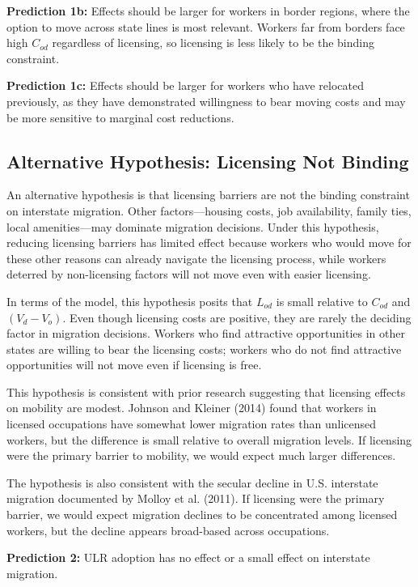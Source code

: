 \documentclass[12pt]{article}
\begin{document}
\textbf{Prediction 1b:} Effects should be larger for workers in border regions, where the option to move across state lines is most relevant. Workers far from borders face high $C_{od}$ regardless of licensing, so licensing is less likely to be the binding constraint.

\textbf{Prediction 1c:} Effects should be larger for workers who have relocated previously, as they have demonstrated willingness to bear moving costs and may be more sensitive to marginal cost reductions.

\subsection{Alternative Hypothesis: Licensing Not Binding}

An alternative hypothesis is that licensing barriers are not the binding constraint on interstate migration. Other factors---housing costs, job availability, family ties, local amenities---may dominate migration decisions. Under this hypothesis, reducing licensing barriers has limited effect because workers who would move for these other reasons can already navigate the licensing process, while workers deterred by non-licensing factors will not move even with easier licensing.

In terms of the model, this hypothesis posits that $L_{od}$ is small relative to $C_{od}$ and $(V_d - V_o)$. Even though licensing costs are positive, they are rarely the deciding factor in migration decisions. Workers who find attractive opportunities in other states are willing to bear the licensing costs; workers who do not find attractive opportunities will not move even if licensing is free.

This hypothesis is consistent with prior research suggesting that licensing effects on mobility are modest. Johnson and Kleiner (2014) found that workers in licensed occupations have somewhat lower migration rates than unlicensed workers, but the difference is small relative to overall migration levels. If licensing were the primary barrier to mobility, we would expect much larger differences.

The hypothesis is also consistent with the secular decline in U.S. interstate migration documented by Molloy et al. (2011). If licensing were the primary barrier, we would expect migration declines to be concentrated among licensed workers, but the decline appears broad-based across occupations.

\textbf{Prediction 2:} ULR adoption has no effect or a small effect on interstate migration.
\end{document}
